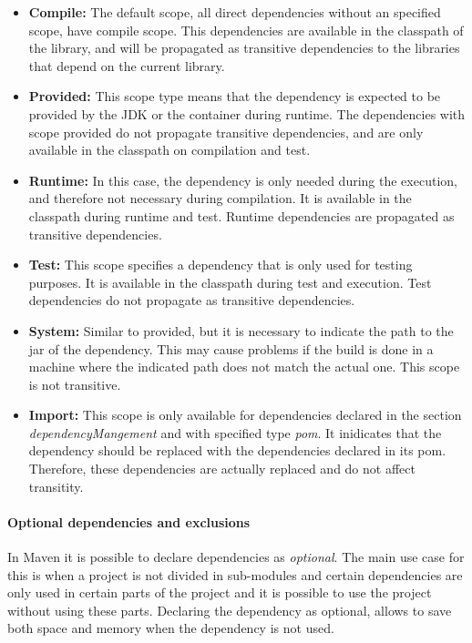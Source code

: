 \begin{itemize}
  \item \textbf{Compile:} The default scope, all direct dependencies without an specified scope, have compile scope. This dependencies are available in the classpath of the library, and will be propagated as transitive dependencies to the libraries that depend on the current library.

  \item \textbf{Provided:} This scope type means that the dependency is expected to be provided by the JDK or the container during runtime. The dependencies with scope provided do not propagate transitive dependencies, and are only available in the classpath on compilation and test.

  \item \textbf{Runtime:} In this case, the dependency is only needed during the execution, and therefore not necessary during compilation. It is available in the classpath during runtime and test. Runtime dependencies are propagated as transitive dependencies.

  \item \textbf{Test:} This scope specifies a dependency that is only used for testing purposes. It is available in the classpath during test and execution. Test dependencies do not propagate as transitive dependencies.

  \item \textbf{System:} Similar to provided, but it is necessary to indicate the path to the jar of the dependency. This may cause problems if the build is done in a machine where the indicated path does not match the actual one. This scope is not transitive.

  \item \textbf{Import:} This scope is only available for dependencies declared in the section \textit{dependencyMangement} and with specified type \textit{pom}. It inidicates that the dependency should be replaced with the dependencies declared in its pom. Therefore, these dependencies are actually replaced and do not affect transitity.
\end{itemize}

\paragraph{Optional dependencies and exclusions}
In Maven it is possible to declare dependencies as \textit{optional}. The main use case for this is when a project is not divided in sub-modules and certain dependencies are only used in certain parts of the project and it is possible to use the project without using these parts. Declaring the dependency as optional, allows to save both space and memory when the dependency is not used.

